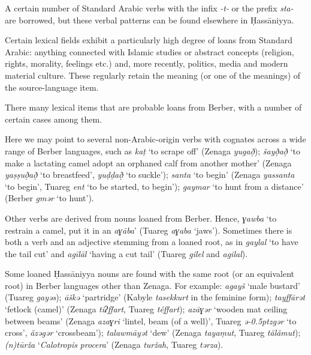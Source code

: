 \documentclass[output=paper]{langsci/langscibook}
\begin{document}
A certain number of Standard Arabic verbs with the infix \textit{{}-}\textit{t-} or the prefix \textit{sta-} are borrowed, but these verbal patterns can be found elsewhere in Ḥassāniyya. 

Certain lexical fields exhibit a particularly high degree of loans from Standard Arabic: anything connected with Islamic studies or abstract concepts (religion, rights, morality, feelings etc.) and, more recently, politics, media and modern material culture. These regularly retain the meaning (or one of the meanings) of the source-language item. 


There many lexical items that are probable loans from Berber, with a number of certain cases among them. 

Here we may point to several non-Arabic-origin verbs with cognates across a wide range of Berber languages, such as \textit{k{\R}aṭ} ‘to scrape off’ (Zenaga \textit{yug{\R}að̣}); \textit{šayð̣að̣} ‘to make a lactating camel adopt an orphaned calf from another mother’ (Zenaga \textit{yaṣṣuð̣að̣} ‘to breastfeed’, \textit{yuḍḍað̣} ‘to suckle’); \textit{santa} ‘to begin’ (Zenaga \textit{yassanta} ‘to begin’, Tuareg \textit{ent} ‘to be started, to begin’); \textit{gaymar} ‘to hunt from a distance’ (Berber \textit{gmər} ‘to hunt'). 

Other verbs are derived from nouns loaned from Berber. Hence, \textit{ɣawba} ‘to restrain a camel, put it in an \textit{aɣāba}’ (Tuareg \textit{aɣaba} ‘jaws’). Sometimes there is both a verb and an adjective stemming from a loaned root, as in \textit{gaylal} ‘to have the tail cut’ and \textit{agīlāl} ‘having a cut tail’ (Tuareg \textit{gilel} and \textit{agilal}). 

Some loaned Ḥassāniyya nouns are found with the same root (or an equivalent root) in Berber languages other than Zenaga. For example: \textit{agayš} ‘male bustard’ (Tuareg \textit{gayəs}); \textit{āškə{\R}} ‘partridge’ (Kabyle \textit{tasekkurt} in the feminine form); \textit{tayffārət} ‘fetlock (camel)’ (Zenaga \textit{tiʔffart}, Tuareg \textit{téffart}); \textit{azāɣər} ‘wooden mat ceiling between beams’ (Zenaga \textit{azaɣri} ‘lintel, beam (of a well)’, Tuareg \textit{ǝ\kern -0.5ptzgər} ‘to cross’, \textit{ăzəgər} ‘crossbeam’); \textit{talawmāyət} ‘dew’ (Zenaga \textit{tayaṃut}, Tuareg \textit{tălămut}); \textit{(n)tūrža} ‘\textit{Calotropis} \textit{procera}’ (Zenaga \textit{turžah}, Tuareg \textit{tərza}).
\end{document}
